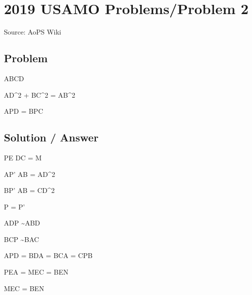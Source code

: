 \documentclass[12pt]{article}
\begin{document}
\section*{2019 USAMO Problems/Problem 2}
Source: AoPS Wiki

\subsection*{Problem}
ABCD

AD^2 + BC^2 = AB^2


\angle APD = \angle BPC


\subsection*{Solution / Answer}
PE \cap DC = M

AP' \cdot AB = AD^2

BP' \cdot AB = CD^2

P = P'

ADP \sim ABD

BCP \sim BAC

\measuredangle APD = \measuredangle BDA = \measuredangle BCA = \measuredangle CPB

\square

\measuredangle PEA = \measuredangle MEC = \measuredangle BEN

\measuredangle MEC = \measuredangle BEN
\end{document}
